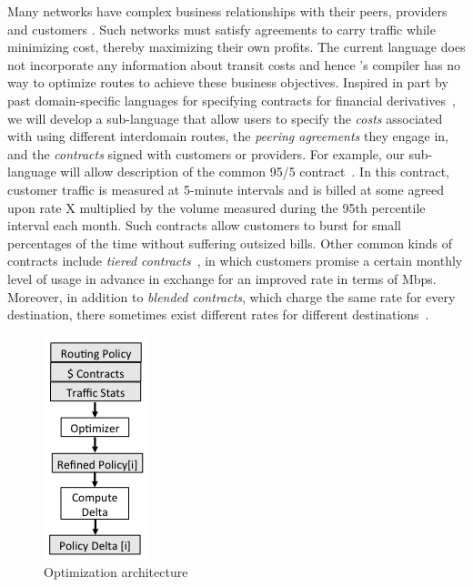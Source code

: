 Many networks have complex business relationships with their peers, providers and 
customers \cite{routingplaybook}.  Such networks must satisfy agreements to carry traffic 
while minimizing
cost, thereby maximizing their own profits. The current \Propane language does
not incorporate any information about transit costs 
and hence \Propane's compiler has no way to optimize routes to achieve these
business objectives.
Inspired in part by past domain-specific languages for specifying contracts for financial derivatives~\cite{spj+:contracts},
we will develop a sub-language that allow users to specify the
\emph{costs} associated with using different interdomain routes, the \emph{peering agreements} they
engage in, and the \emph{contracts} signed with customers or providers.  For example,
our sub-language will allow description of the common 95/5 contract~\cite{routingplaybook}.  
In this contract, customer traffic is measured at 5-minute intervals and is billed at 
some agreed upon rate X multiplied by the
volume measured during the 95th percentile interval each month.  Such contracts allow customers to burst for small
percentages of the time without suffering outsized bills.  Other common kinds of contracts include
\emph{tiered contracts}~\cite{tiered-isp-contracts}, in which customers promise a certain monthly level
of usage in advance in exchange for an improved rate in terms of Mbps.  Moreover,
in addition to \emph{blended contracts}, which charge the same rate for every destination,
there sometimes exist different rates for different destinations~\cite{tiered-isp-contracts}.

\begin{figure}
  \centering
  \includegraphics[width=.15\textwidth]{figures/cost-optimizer}
\caption{Optimization architecture}
  \label{fig:optimizer}
  \vspace{-1em}
\end{figure}

